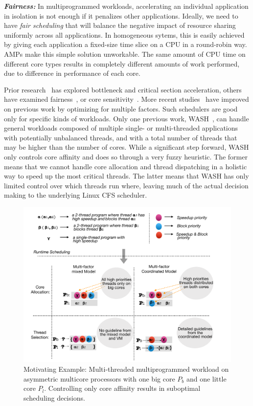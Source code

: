\textbf{\textit{Fairness:}} In multiprogrammed workloads, accelerating an individual application in isolation is not enough if it penalizes other applications. Ideally, we need to have \emph{fair scheduling} that will balance the negative impact of resource sharing uniformly across all applications. In homogeneous sytems, this is easily achieved by giving each application a fixed-size time slice on a CPU in a round-robin way. AMPs make this simple solution unworkable. The same amount of CPU time on different core types results in completely different amounts of work performed, due to difference in performance of each core.


Prior research~\cite{han2018multicore,chronaki2017task,joao2012bottleneck,suleman2009accelerating,du2013criticality} has explored bottleneck and critical section acceleration, others have examined fairness~\cite{zahedi2018amdahl,wang2016rebudget,van2012scheduling,li2009efficient,li2007efficient}, or core sensitivity~\cite{cao2012yin,kumar2004single,becchi2006dynamic}. More recent studies~\cite{kim2018exploring,kim2016fairness,saez2012leveraging,van2013fairness,joao2013utility} have improved on previous work by optimizing for multiple factors. Such schedulers are good only for specific kinds of workloads. Only one previous work, WASH~\cite{jibaja2016portable}, can handle general workloads composed of multiple single- or multi-threaded applications with potentially unbalanced threads, and with a total number of threads that may be higher than the number of cores. While a significant step forward, WASH only controls core affinity and does so through a very fuzzy heuristic. The former means that we cannot handle core allocation and thread dispatching in a holistic way to speed up the most critical threads. The latter means that WASH has only limited control over which threads run where, leaving much of the actual decision making to the underlying Linux CFS scheduler.

\begin{figure}
\centering
\includegraphics[scale = 0.25]{figures/me.pdf}
\caption{Motivating Example: Multi-threaded multiprogrammed workload on asymmetric multicore processors with one big core $P_b$ and one little core $P_l$. Controlling only core affinity results in suboptimal scheduling decisions.}
\label{me}
\end{figure} 

